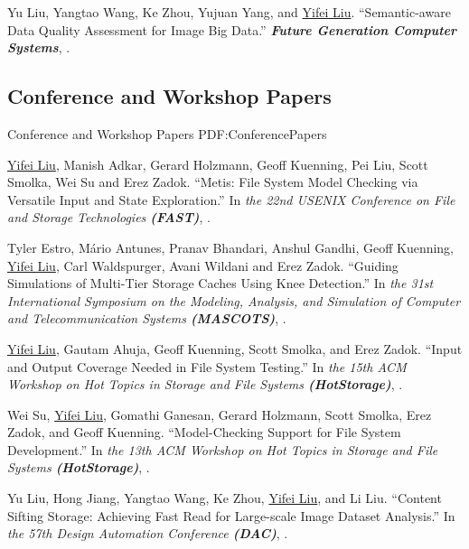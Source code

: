 \documentclass[a4paper,10pt,oneside]{article}
\begin{document}
\begin{body}
\NumberedItem{[3]}
Yu Liu, Yangtao Wang, Ke Zhou, Yujuan Yang, and \underline{Yifei Liu}.
``Semantic-aware Data Quality Assessment for Image Big Data.'' 
\textit{\textbf{Future Generation Computer Systems}},
.

\subsection
{Conference and Workshop Papers}
{Conference and Workshop Papers}
{PDF:ConferencePapers}

\NumberedItem{[1]}
\underline{Yifei Liu}, Manish Adkar, Gerard Holzmann, Geoff Kuenning, Pei Liu, Scott Smolka, Wei Su and Erez Zadok.
``Metis: File System Model Checking via Versatile Input and State Exploration.''
In \textit{the 22nd USENIX Conference on File and Storage Technologies
\textbf{(FAST)}}, %
. 

\NumberedItem{[2]}
Tyler Estro, Mário Antunes, Pranav Bhandari, Anshul Gandhi, Geoff Kuenning, \underline{Yifei Liu}, Carl Waldspurger, Avani Wildani and Erez Zadok.
``Guiding Simulations of Multi-Tier Storage Caches Using Knee Detection.''
In \textit{the 31st International Symposium on the Modeling, Analysis, and Simulation of Computer and Telecommunication Systems \textbf{(MASCOTS)}}, %
. 

\Gap

\NumberedItem{[3]}
\underline{Yifei Liu}, Gautam Ahuja, Geoff Kuenning, Scott Smolka, and Erez Zadok.
``Input and Output Coverage Needed in File System Testing.''
In \textit{the 15th ACM Workshop on Hot Topics in Storage and File Systems \textbf{(HotStorage)}}, %
.


\NumberedItem{[4]}
Wei Su, \underline{Yifei Liu}, Gomathi Ganesan, Gerard Holzmann, Scott Smolka, Erez Zadok, and Geoff Kuenning.
``Model-Checking Support for File System Development.''
In \textit{the 13th ACM Workshop on Hot Topics in Storage and File Systems \textbf{(HotStorage)}}, %
.


\NumberedItem{[5]}
Yu Liu, Hong Jiang, Yangtao Wang, Ke Zhou, \underline{Yifei Liu}, and Li Liu.
``Content Sifting Storage: Achieving Fast Read for Large-scale Image Dataset Analysis.''
In \textit{the 57th Design Automation Conference \textbf{(DAC)}}, %
.


\end{body}
\end{document}
